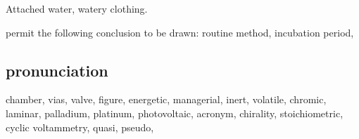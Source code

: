 Attached water, watery clothing. 

permit the following conclusion to be drawn: routine method, incubation period, 


\subsection{pronunciation}

chamber, vias, valve, figure, energetic, managerial, inert, volatile, chromic,
laminar, palladium, platinum, photovoltaic, acronym, chirality, stoichiometric, cyclic voltammetry, quasi, pseudo, 

